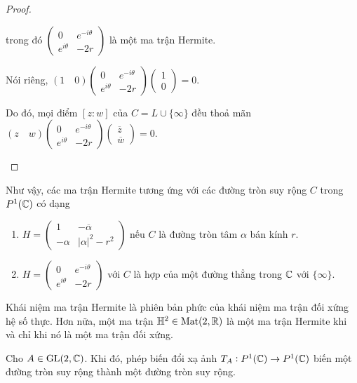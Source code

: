 \begin{proof}
\begin{enumerate}
        trong đó $\begin{pmatrix}
            0 & e^{-i\theta}\\
            e^{i\theta} & -2r
        \end{pmatrix}$ là một ma trận Hermite.

        Nói riêng, $(1 \quad 0)\begin{pmatrix}
            0 & e^{-i\theta}\\
            e^{i\theta} & -2r
        \end{pmatrix}\begin{pmatrix}
            1 \\ 0
        \end{pmatrix} = 0.$

        Do đó, mọi điểm $[z:w]$ của $C = L \cup \{\infty\}$ đều thoả mãn 
        $(z\quad w)\begin{pmatrix}
            0 & e^{-i\theta}\\
            e^{i\theta} & -2r
        \end{pmatrix}\begin{pmatrix}
            \overline{z}\\ \overline{w}
        \end{pmatrix} = 0$. 
    \end{enumerate}
\end{proof}
Như vậy, các ma trận Hermite tương ứng với các đường tròn suy rộng $C$ trong $P^1(\mathbb{C})$ có dạng 
\begin{enumerate}
    \item $H = \begin{pmatrix}
            1 & -\overline{\alpha}\\
            -\alpha & |\alpha|^2-r^2
        \end{pmatrix}$ nếu $C$ là đường tròn tâm $\alpha$ bán kính $r$.
    \item $H = \begin{pmatrix}
            0 & e^{-i\theta}\\
            e^{i\theta} & -2r
        \end{pmatrix}$ với $C$ là hợp của một đường thẳng trong $\mathbb{C}$ với $\{\infty\}$.
\end{enumerate}
Khái niệm ma trận Hermite là phiên bản phức của khái niệm ma trận đối xứng hệ số thực. Hơn nữa, một ma trận $\mathbb{H}^2 \in \operatorname{Mat}(2,\mathbb{R})$ là một ma trận Hermite khi và chỉ khi nó là một ma trận đối xứng. 
\begin{prop}\label{prop 2.2.8}
    Cho $A \in \operatorname{GL}(2,\mathbb{C})$. Khi đó, phép biến đổi xạ ảnh $T_A: P^1(\mathbb{C})\to P^1(\mathbb{C})$ biến một đường tròn suy rộng thành một đường tròn suy rộng.
\end{prop}

